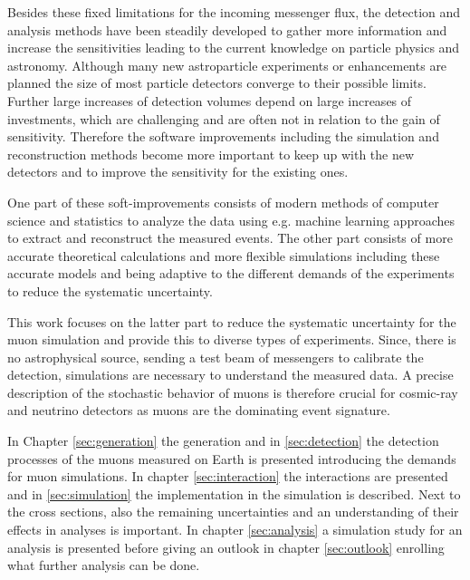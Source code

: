 Besides these fixed limitations for the incoming messenger flux, the detection and analysis methods have been steadily developed to gather more information and increase the sensitivities leading to the current knowledge on particle physics and astronomy.
Although many new astroparticle experiments or enhancements are planned the size of most particle detectors converge to their possible limits.
Further large increases of detection volumes depend on large increases of investments, which are challenging and are often not in relation to the gain of sensitivity.
Therefore the software improvements including the simulation and reconstruction methods become more important to keep up with the new detectors and to improve the sensitivity for the existing ones.

One part of these soft-improvements consists of modern methods of computer science and statistics to analyze the data using e.g. machine learning approaches to extract and reconstruct the measured events.
The other part consists of more accurate theoretical calculations and more flexible simulations including these accurate models and being adaptive to the different demands of the experiments to reduce the systematic uncertainty.

This work focuses on the latter part to reduce the systematic uncertainty for the muon simulation and provide this to diverse types of experiments.
Since, there is no astrophysical source, sending a test beam of messengers to calibrate the detection, simulations are necessary to understand the measured data.
A precise description of the stochastic behavior of muons is therefore crucial for cosmic-ray and neutrino detectors as muons are the dominating event signature.

In Chapter \ref{sec:generation} the generation and in \ref{sec:detection} the detection processes of the muons measured on Earth is presented introducing the demands for muon simulations.
In chapter \ref{sec:interaction} the interactions are presented and in \ref{sec:simulation} the implementation in the simulation is described.
Next to the cross sections, also the remaining uncertainties and an understanding of their effects in analyses is important.
In chapter \ref{sec:analysis} a simulation study for an analysis is presented before giving an outlook in chapter \ref{sec:outlook} enrolling what further analysis can be done.
